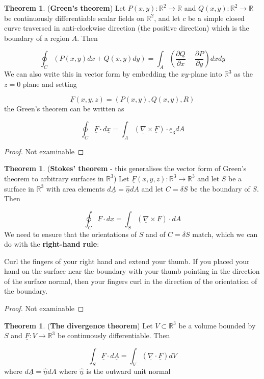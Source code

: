 \documentclass[12pt,a4paper]{article}
\theoremstyle{definition}
\newtheorem{theorem}[definition]{Theorem}
\begin{document}
\begin{theorem}
	(\textbf{Green's theorem}) Let $P(x, y): \mathbb{R}^2 \rightarrow \mathbb{R}$ and $Q(x, y): \mathbb{R}^2 \rightarrow \mathbb{R}$ be continuously differentiable scalar fields on $\mathbb{R}^2$, and let $c$ be a simple closed curve traversed in anti-clockwise direction (the positive direction) which is the boundary of a region $A$. Then
	
	\[\oint_C (P(x, y) dx + Q(x, y) dy) = \int_A \left( \frac{\partial Q}{\partial x} - \frac{\partial P}{\partial y} \right) dx dy \]
	We can also write this in vector form by embedding the $xy$-plane into $\mathbb{R}^3$ as the $z = 0$ plane and setting

	\[ \underline{F}(x, y, z) = (P(x, y), Q(x, y), R) \]
	the Green's theorem can be written as

	\[ \oint_C \underline{F} \cdot d\underline{x} = \int_A \left( \underline{\nabla} \times \underline{F} \right) \cdot \underline{e}_3 dA \]
\end{theorem}

\begin{proof}
	Not examinable
\end{proof}

\begin{theorem}
	(\textbf{Stokes' theorem} - this generalises the vector form of Green's theorem to arbitrary surfaces in $\mathbb{R}^3$) Let $\underline{F}(x, y, z): \mathbb{R}^3 \rightarrow \mathbb{R}^3$ and let $S$ be a surface in $\mathbb{R}^3$ with area elements $d\underline{A} = \underline{\hat{n}} dA$ and let $C = \delta S$ be the boundary of $S$. Then

	\[ \oint_C \underline{F} \cdot d\underline{x} = \int_S \left( \underline{\nabla} \times \underline{F} \right) \cdot dA \]
	We need to ensure that the orientations of $S$ and of $C = \delta S$ match, which we can do with the \textbf{right-hand rule}:

	Curl the fingers of your right hand and extend your thumb. If you placed your hand on the surface near the boundary with your thumb pointing in the direction of the surface normal, then your fingers curl in the direction of the orientation of the boundary.
\end{theorem}

\begin{proof}
	Not examinable
\end{proof}

\begin{theorem}
	(\textbf{The divergence theorem}) Let $V \subset \mathbb{R}^3$ be a volume bounded by $S$ and $\underline{F}: V \rightarrow \mathbb{R}^3$ be continuously differentiable. Then

	\[ \int_S \underline{F} \cdot d\underline{A} = \int_V \left( \underline{\nabla} \cdot \underline{F} \right) dV \]
	where $d\underline{A} = \underline{\hat{n}} dA$ where $\underline{\hat{n}}$ is the outward unit normal
\end{theorem}
\end{document}

